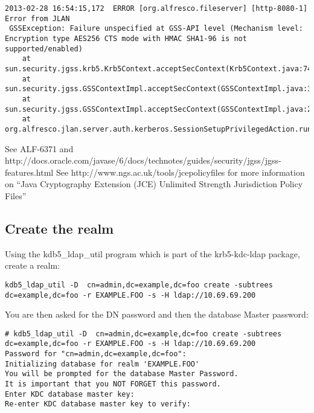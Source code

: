 \documentclass[12pt,a4]{article}
\begin{document}
\begin{verbatim}
2013-02-28 16:54:15,172  ERROR [org.alfresco.fileserver] [http-8080-1] Error from JLAN
 GSSException: Failure unspecified at GSS-API level (Mechanism level: Encryption type AES256 CTS mode with HMAC SHA1-96 is not supported/enabled)
	at sun.security.jgss.krb5.Krb5Context.acceptSecContext(Krb5Context.java:741)
	at sun.security.jgss.GSSContextImpl.acceptSecContext(GSSContextImpl.java:323)
	at sun.security.jgss.GSSContextImpl.acceptSecContext(GSSContextImpl.java:267)
	at org.alfresco.jlan.server.auth.kerberos.SessionSetupPrivilegedAction.run(SessionSetupPrivilegedAction.java:102)
\end{verbatim}
See ALF-6371 and http://docs.oracle.com/javase/6/docs/technotes/guides/security/jgss/jgss-features.html
See http://www.ngs.ac.uk/tools/jcepolicyfiles for more information on ``Java Cryptography Extension (JCE) Unlimited Strength Jurisdiction Policy Files''


\subsection{Create the realm}
Using the kdb5\_ldap\_util program which is part of the krb5-kdc-ldap package, create a realm:
\begin{verbatim}
kdb5_ldap_util -D  cn=admin,dc=example,dc=foo create -subtrees dc=example,dc=foo -r EXAMPLE.FOO -s -H ldap://10.69.69.200
\end{verbatim}
You are then asked for the DN password and then the database Master password:
\begin{verbatim}
# kdb5_ldap_util -D  cn=admin,dc=example,dc=foo create -subtrees dc=example,dc=foo -r EXAMPLE.FOO -s -H ldap://10.69.69.200
Password for "cn=admin,dc=example,dc=foo": 
Initializing database for realm 'EXAMPLE.FOO'
You will be prompted for the database Master Password.
It is important that you NOT FORGET this password.
Enter KDC database master key: 
Re-enter KDC database master key to verify: 
\end{verbatim}
\end{document}
